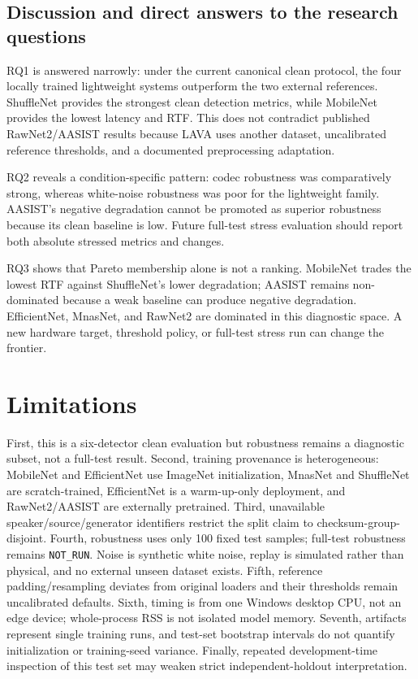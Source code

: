 \documentclass[10pt,journal]{IEEEtran}
\begin{document}
\subsection{Discussion and direct answers to the research questions}
RQ1 is answered narrowly: under the current canonical clean protocol, the four locally trained lightweight systems outperform the two external references. ShuffleNet provides the strongest clean detection metrics, while MobileNet provides the lowest latency and RTF. This does not contradict published RawNet2/AASIST results because LAVA uses another dataset, uncalibrated reference thresholds, and a documented preprocessing adaptation.

RQ2 reveals a condition-specific pattern: codec robustness was comparatively strong, whereas white-noise robustness was poor for the lightweight family. AASIST's negative degradation cannot be promoted as superior robustness because its clean baseline is low. Future full-test stress evaluation should report both absolute stressed metrics and changes.

RQ3 shows that Pareto membership alone is not a ranking. MobileNet trades the lowest RTF against ShuffleNet's lower degradation; AASIST remains non-dominated because a weak baseline can produce negative degradation. EfficientNet, MnasNet, and RawNet2 are dominated in this diagnostic space. A new hardware target, threshold policy, or full-test stress run can change the frontier.

\section{Limitations}
First, this is a six-detector clean evaluation but robustness remains a diagnostic subset, not a full-test result. Second, training provenance is heterogeneous: MobileNet and EfficientNet use ImageNet initialization, MnasNet and ShuffleNet are scratch-trained, EfficientNet is a warm-up-only deployment, and RawNet2/AASIST are externally pretrained. Third, unavailable speaker/source/generator identifiers restrict the split claim to checksum-group-disjoint. Fourth, robustness uses only 100 fixed test samples; full-test robustness remains \texttt{NOT\_RUN}. Noise is synthetic white noise, replay is simulated rather than physical, and no external unseen dataset exists. Fifth, reference padding/resampling deviates from original loaders and their thresholds remain uncalibrated defaults. Sixth, timing is from one Windows desktop CPU, not an edge device; whole-process RSS is not isolated model memory. Seventh, artifacts represent single training runs, and test-set bootstrap intervals do not quantify initialization or training-seed variance. Finally, repeated development-time inspection of this test set may weaken strict independent-holdout interpretation.
\end{document}
